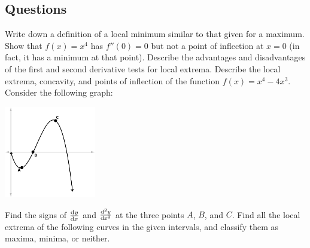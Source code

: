 \clearpage
\subsection*{Questions}
\begin{questions}
  \questioA Write down a definition of a local minimum similar to that given for a maximum.
  \questioA Show that $ f(x) = x^4 $ has $ f''(0) = 0 $ but not a point of inflection at $ x = 0 $ (in fact, it has a minimum at that point).
  \questioA Describe the advantages and disadvantages of the first and second derivative tests for local extrema.
  \questioM Describe the local extrema, concavity, and points of inflection of the function $ f(x) = x^4 - 4x^3 $.
  \questioA Consider the following graph:
            \begin{center}
              \includegraphics[width=0.3\textwidth]{curvature}
            \end{center}
            Find the signs of $ \od{y}{x} $ and $ \od[2]{y}{x} $ at the three points $ A $, $ B $, and $ C $.
  \questioM Find all the local extrema of the following curves in the given intervals, and classify them as maxima, minima, or neither.
\end{questions}
